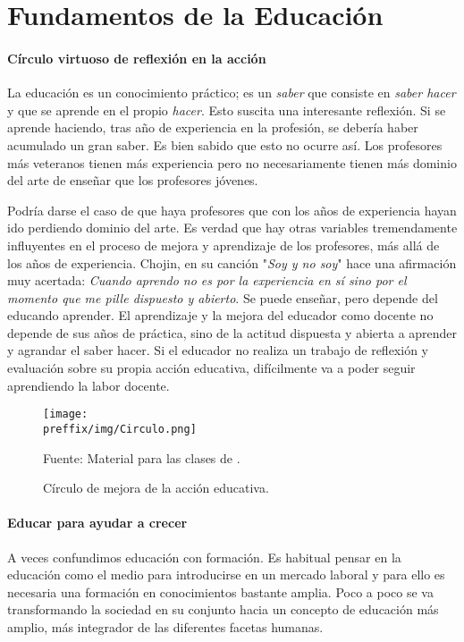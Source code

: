 \section{Fundamentos de la Educación}

\paragraph{Círculo virtuoso de reflexión en la acción}
La educación es un conocimiento práctico; es un \textit{saber} que consiste en \textit{saber hacer} y que se aprende en el propio \textit{hacer}.
%
Esto suscita una interesante reflexión.
%
Si se aprende haciendo, tras año de experiencia en la profesión, se debería haber acumulado un gran saber.
%
Es bien sabido que esto no ocurre así.
%
Los profesores más veteranos tienen más experiencia pero no necesariamente tienen más dominio del arte de enseñar que los profesores jóvenes. 

Podría darse el caso de que haya profesores que con los años de experiencia hayan ido perdiendo dominio del arte. 
%
Es verdad que hay otras variables tremendamente influyentes en el proceso de mejora y aprendizaje de los profesores, más allá de los años de experiencia.
%
Chojin, en su canción "\textit{Soy y no soy}" hace una afirmación muy acertada: \textit{Cuando aprendo no es por la experiencia en sí sino por el momento que me pille dispuesto y abierto}.
%
Se puede enseñar, pero depende del educando aprender.
%
El aprendizaje y la mejora del educador como docente no depende de sus años de práctica, sino de la actitud dispuesta y abierta a aprender y agrandar el saber hacer.
%
Si el educador no realiza un trabajo de reflexión y evaluación sobre su propia acción educativa, difícilmente va a poder seguir aprendiendo la labor docente.

\begin{figure}[hbt]
\centering
\caption{Círculo de mejora de la acción educativa.}
\texttt{[image: \\preffix/img/Circulo.png]}

\small{Fuente: Material para las clases de \profe.}
\label{Circulo}
\end{figure}

\paragraph{Educar para ayudar a crecer} A veces confundimos educación con formación. 
%
Es habitual pensar en la educación como el medio para introducirse en un mercado laboral y para ello es necesaria una formación en conocimientos bastante amplia.
%
Poco a poco se va transformando la sociedad en su conjunto hacia un concepto de educación más amplio, más integrador de las diferentes facetas humanas.

